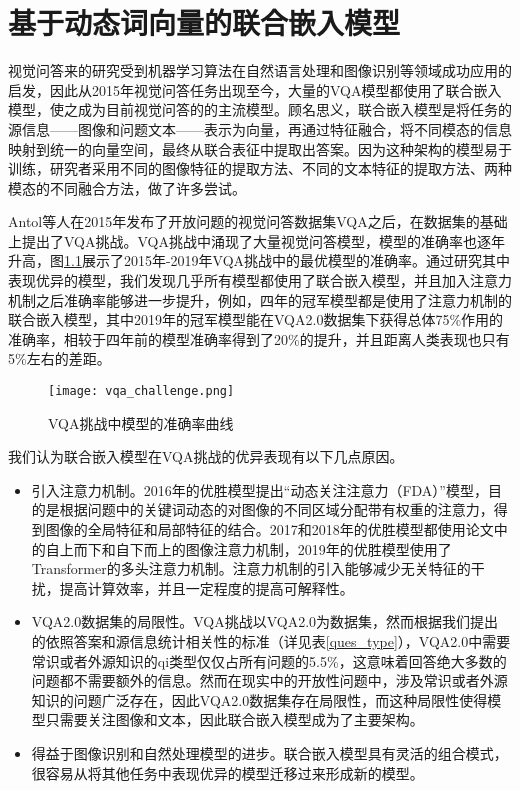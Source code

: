 
\chapter{基于动态词向量的联合嵌入模型}
视觉问答来的研究受到机器学习算法在自然语言处理和图像识别等领域成功应用的启发，因此从2015年视觉问答任务出现至今，大量的VQA模型都使用了联合嵌入模型，使之成为目前视觉问答的的主流模型。顾名思义，联合嵌入模型是将任务的源信息——图像和问题文本——表示为向量，再通过特征融合，将不同模态的信息映射到统一的向量空间，最终从联合表征中提取出答案。因为这种架构的模型易于训练，研究者采用不同的图像特征的提取方法、不同的文本特征的提取方法、两种模态的不同融合方法，做了许多尝试。

Antol等人在2015年发布了开放问题的视觉问答数据集VQA之后，在数据集的基础上提出了VQA挑战。VQA挑战中涌现了大量视觉问答模型，模型的准确率也逐年升高，图\ref{vqa_challenge}展示了2015年-2019年VQA挑战中的最优模型的准确率。通过研究其中表现优异的模型，我们发现几乎所有模型都使用了联合嵌入模型，并且加入注意力机制之后准确率能够进一步提升，例如，四年的冠军模型都是使用了注意力机制的联合嵌入模型，其中2019年的冠军模型能在VQA2.0数据集下获得总体75\%作用的准确率，相较于四年前的模型准确率得到了20\%的提升，并且距离人类表现也只有5\%左右的差距。
\begin{figure}[H]
	\texttt{[image: vqa\_challenge.png]}
	\caption{VQA挑战中模型的准确率曲线}
	\label{vqa_challenge}
\end{figure}

我们认为联合嵌入模型在VQA挑战的优异表现有以下几点原因。
\begin{itemize}
  \item [1)] 
  引入注意力机制。2016年的优胜模型提出“动态关注注意力（FDA）”模型，目的是根据问题中的关键词动态的对图像的不同区域分配带有权重的注意力，得到图像的全局特征和局部特征的结合。2017和2018年的优胜模型都使用论文中的自上而下和自下而上的图像注意力机制，2019年的优胜模型使用了Transformer的多头注意力机制。注意力机制的引入能够减少无关特征的干扰，提高计算效率，并且一定程度的提高可解释性。
  \item [2)]
  VQA2.0数据集的局限性。VQA挑战以VQA2.0为数据集，然而根据我们提出的依照答案和源信息统计相关性的标准（详见表\ref{ques_type}），VQA2.0中需要常识或者外源知识的qi类型仅仅占所有问题的5.5\%，这意味着回答绝大多数的问题都不需要额外的信息。然而在现实中的开放性问题中，涉及常识或者外源知识的问题广泛存在，因此VQA2.0数据集存在局限性，而这种局限性使得模型只需要关注图像和文本，因此联合嵌入模型成为了主要架构。
  \item [3)]
  得益于图像识别和自然处理模型的进步。联合嵌入模型具有灵活的组合模式，很容易从将其他任务中表现优异的模型迁移过来形成新的模型。
\end{itemize}

